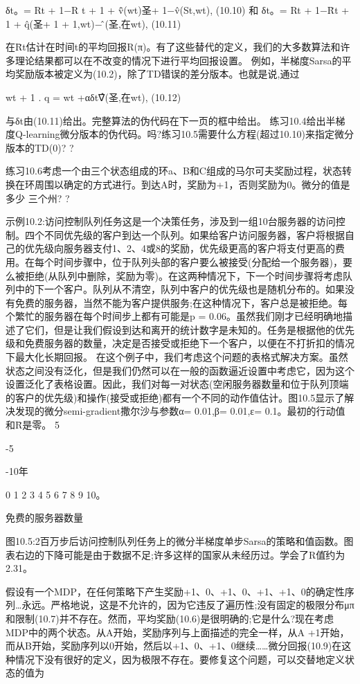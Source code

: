 δt。= Rt + 1−R t + 1 + v̄̂(wt)圣+ 1−v̂(St,wt), 					(10.10)
和
δt。= Rt + 1−R̄t + 1 + q̂(圣+ 1 + 1,wt)−问̂(圣,在wt), 					(10.11)

在R̄t估计在时间t的平均回报R(π)。有了这些替代的定义，我们的大多数算法和许多理论结果都可以在不改变的情况下进行平均回报设置。
例如，半梯度Sarsa的平均奖励版本被定义为(10.2)，除了TD错误的差分版本。也就是说,通过

wt + 1
.
q = wt +αδt∇̂(圣,在wt), 					(10.12)

与δt由(10.11)给出。完整算法的伪代码在下一页的框中给出。
练习10.4给出半梯度Q-learning微分版本的伪代码。吗?练习10.5需要什么方程(超过10.10)来指定微分
版本的TD(0)? 					?

练习10.6考虑一个由三个状态组成的环a、B和C组成的马尔可夫奖励过程，状态转换在环周围以确定的方式进行。到达A时，奖励为+1，否则奖励为0。微分的值是多少
三个州? 					?

示例10.2:访问控制队列任务这是一个决策任务，涉及到一组10台服务器的访问控制。四个不同优先级的客户到达一个队列。如果给客户访问服务器，客户将根据自己的优先级向服务器支付1、2、4或8的奖励，优先级更高的客户将支付更高的费用。在每个时间步骤中，位于队列头部的客户要么被接受(分配给一个服务器)，要么被拒绝(从队列中删除，奖励为零)。在这两种情况下，下一个时间步骤将考虑队列中的下一个客户。队列从不清空，队列中客户的优先级也是随机分布的。如果没有免费的服务器，当然不能为客户提供服务;在这种情况下，客户总是被拒绝。每个繁忙的服务器在每个时间步上都有可能是p = 0.06。虽然我们刚才已经明确地描述了它们，但是让我们假设到达和离开的统计数字是未知的。任务是根据他的优先级和免费服务器的数量，决定是否接受或拒绝下一个客户，以便在不打折扣的情况下最大化长期回报。
在这个例子中，我们考虑这个问题的表格式解决方案。虽然状态之间没有泛化，但是我们仍然可以在一般的函数逼近设置中考虑它，因为这个设置泛化了表格设置。因此，我们对每一对状态(空闲服务器数量和位于队列顶端的客户的优先级)和操作(接受或拒绝)都有一个不同的动作值估计。图10.5显示了解决发现的微分semi-gradient撒尔沙与参数α= 0.01,β= 0.01,ε= 0.1。最初的行动值和R̄是零。
5
 
-5




-10年


0 1 2 3 4 5 6 7 8 9 10。

免费的服务器数量

图10.5:2百万步后访问控制队列任务上的微分半梯度单步Sarsa的策略和值函数。图表右边的下降可能是由于数据不足;许多这样的国家从未经历过。学会了R值̄约为2.31。



假设有一个MDP，在任何策略下产生奖励+1、0、+1、0、+1、+1、0的确定性序列…永远。严格地说，这是不允许的，因为它违反了遍历性;没有固定的极限分布μπ和限制(10.7)并不存在。然而，平均奖励(10.6)是很明确的;它是什么?现在考虑MDP中的两个状态。从A开始，奖励序列与上面描述的完全一样，从A +1开始，而从B开始，奖励序列以0开始，然后以+1、0、+1、0继续……微分回报(10.9)在这种情况下没有很好的定义，因为极限不存在。要修复这个问题，可以交替地定义状态的值为



